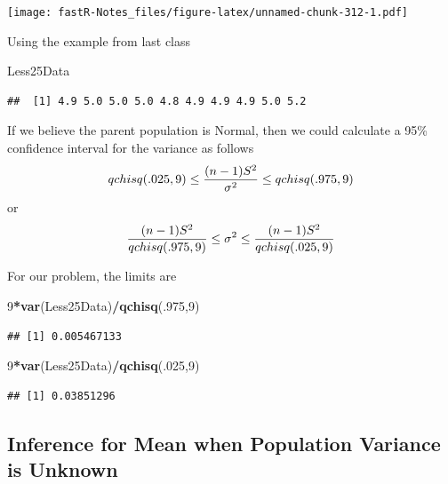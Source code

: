 \documentclass[]{book}
\newenvironment{Shaded}{\begin{snugshade}}{\end{snugshade}}
\newcommand{\KeywordTok}[1]{\textcolor[rgb]{0.13,0.29,0.53}{\textbf{#1}}}
\newcommand{\DecValTok}[1]{\textcolor[rgb]{0.00,0.00,0.81}{#1}}
\newcommand{\OperatorTok}[1]{\textcolor[rgb]{0.81,0.36,0.00}{\textbf{#1}}}
\newcommand{\NormalTok}[1]{#1}
\theoremstyle{definition}
\theoremstyle{definition}
\theoremstyle{definition}
\theoremstyle{remark}
\begin{document}
\texttt{[image: fastR-Notes\_files/figure-latex/unnamed-chunk-312-1.pdf]}

Using the example from last class

\begin{Shaded}
\begin{Highlighting}[]
\NormalTok{Less25Data}
\end{Highlighting}
\end{Shaded}

\begin{verbatim}
##  [1] 4.9 5.0 5.0 5.0 4.8 4.9 4.9 4.9 5.0 5.2
\end{verbatim}

If we believe the parent population is Normal, then we could calculate a
95\% confidence interval for the variance as follows
\[qchisq(.025,9) \leq {(n-1)S^{2} \over \sigma ^{2}} \leq qchisq(.975,9)\]
or
\[{(n-1)S^{2} \over qchisq(.975,9)} \leq \sigma ^{2} \leq {(n-1)S^{2} \over qchisq(.025,9)}\]

For our problem, the limits are

\begin{Shaded}
\begin{Highlighting}[]
\DecValTok{9}\OperatorTok{*}\KeywordTok{var}\NormalTok{(Less25Data)}\OperatorTok{/}\KeywordTok{qchisq}\NormalTok{(.}\DecValTok{975}\NormalTok{,}\DecValTok{9}\NormalTok{)}
\end{Highlighting}
\end{Shaded}

\begin{verbatim}
## [1] 0.005467133
\end{verbatim}

\begin{Shaded}
\begin{Highlighting}[]
\DecValTok{9}\OperatorTok{*}\KeywordTok{var}\NormalTok{(Less25Data)}\OperatorTok{/}\KeywordTok{qchisq}\NormalTok{(.}\DecValTok{025}\NormalTok{,}\DecValTok{9}\NormalTok{)}
\end{Highlighting}
\end{Shaded}

\begin{verbatim}
## [1] 0.03851296
\end{verbatim}

\subsection{Inference for Mean when Population Variance is
Unknown}\label{inference-for-mean-when-population-variance-is-unknown}
\end{document}
